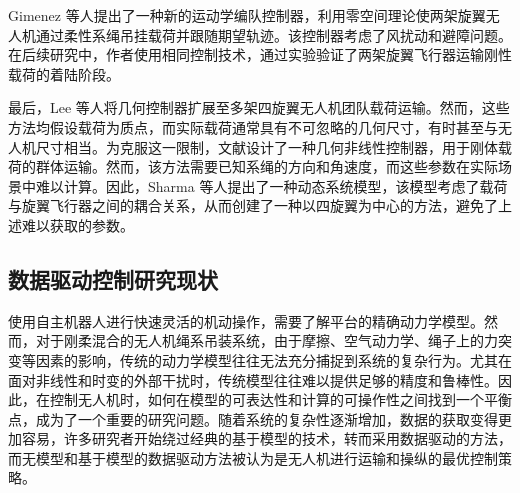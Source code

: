 \documentclass[lang=chs, degree=master, blindreview=false, winfonts=true]{yanputhesis}
\begin{document}
Gimenez 等人\cite{gimenez2018multi}提出了一种新的运动学编队控制器，利用零空间理论使两架旋翼无人机通过柔性系绳吊挂载荷并跟随期望轨迹。该控制器考虑了风扰动和避障问题。在后续研究中，作者使用相同控制技术，通过实验验证了两架旋翼飞行器运输刚性载荷的着陆阶段\cite{gimenez2020control}。

最后，Lee 等人\cite{lee2013geometric}将几何控制器扩展至多架四旋翼无人机团队载荷运输。然而，这些方法均假设载荷为质点，而实际载荷通常具有不可忽略的几何尺寸，有时甚至与无人机尺寸相当。为克服这一限制，文献\cite{lee2017geometric}设计了一种几何非线性控制器，用于刚体载荷的群体运输。然而，该方法需要已知系绳的方向和角速度，而这些参数在实际场景中难以计算。因此，Sharma 等人\cite{sharma2023geometric}提出了一种动态系统模型，该模型考虑了载荷与旋翼飞行器之间的耦合关系，从而创建了一种以四旋翼为中心的方法，避免了上述难以获取的参数。





\subsection{数据驱动控制研究现状}

使用自主机器人进行快速灵活的机动操作，需要了解平台的精确动力学模型。然而，对于刚柔混合的无人机绳系吊装系统，由于摩擦、空气动力学、绳子上的力突变等因素的影响，传统的动力学模型往往无法充分捕捉到系统的复杂行为。尤其在面对非线性和时变的外部干扰时，传统模型往往难以提供足够的精度和鲁棒性。因此，在控制无人机时，如何在模型的可表达性和计算的可操作性之间找到一个平衡点，成为了一个重要的研究问题。随着系统的复杂性逐渐增加，数据的获取变得更加容易，许多研究者开始绕过经典的基于模型的技术，转而采用数据驱动的方法\cite{hou2013model}，而无模型和基于模型的数据驱动方法被认为是无人机进行运输和操纵的最优控制策略。
\end{document}

